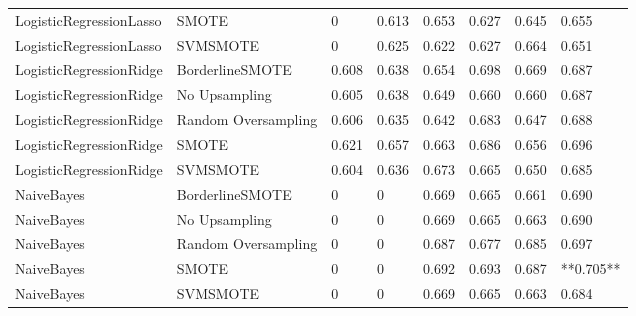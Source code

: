 \begin{tabular}{llllllll}
     LogisticRegressionLasso &               SMOTE &     0 &                     0.613 &                 0.653 &                  0.627 &                                   0.645 &     0.655 \\
     LogisticRegressionLasso &            SVMSMOTE &     0 &                     0.625 &                 0.622 &                  0.627 &                                   0.664 &     0.651 \\
     LogisticRegressionRidge &     BorderlineSMOTE & 0.608 &                     0.638 &                 0.654 &                  0.698 &                                   0.669 &     0.687 \\
     LogisticRegressionRidge &       No Upsampling & 0.605 &                     0.638 &                 0.649 &                  0.660 &                                   0.660 &     0.687 \\
     LogisticRegressionRidge & Random Oversampling & 0.606 &                     0.635 &                 0.642 &                  0.683 &                                   0.647 &     0.688 \\
     LogisticRegressionRidge &               SMOTE & 0.621 &                     0.657 &                 0.663 &                  0.686 &                                   0.656 &     0.696 \\
     LogisticRegressionRidge &            SVMSMOTE & 0.604 &                     0.636 &                 0.673 &                  0.665 &                                   0.650 &     0.685 \\
                  NaiveBayes &     BorderlineSMOTE &     0 &                         0 &                 0.669 &                  0.665 &                                   0.661 &     0.690 \\
                  NaiveBayes &       No Upsampling &     0 &                         0 &                 0.669 &                  0.665 &                                   0.663 &     0.690 \\
                  NaiveBayes & Random Oversampling &     0 &                         0 &                 0.687 &                  0.677 &                                   0.685 &     0.697 \\
                  NaiveBayes &               SMOTE &     0 &                         0 &                 0.692 &                  0.693 &                                   0.687 & **0.705** \\
                  NaiveBayes &            SVMSMOTE &     0 &                         0 &                 0.669 &                  0.665 &                                   0.663 &     0.684 \\

\end{tabular}
